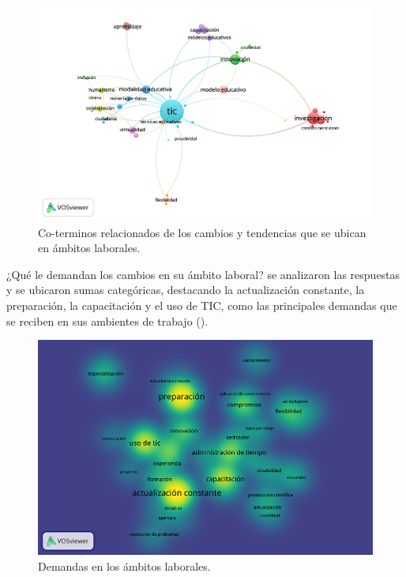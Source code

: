 \documentclass[spanish]{textolivre}
\begin{document}
\begin{figure}[htbp]
 \centering
 \includegraphics[width=\textwidth]{Fig6.png}
 \caption{Co-terminos relacionados de los cambios y tendencias
que se ubican en ámbitos laborales.}
 \label{fig6}
\end{figure}

¿Qué le demandan los cambios en su ámbito laboral? se analizaron las respuestas y se ubicaron sumas categóricas, destacando la actualización constante, la preparación, la capacitación y el uso de TIC, como las principales demandas que se reciben en sus ambientes de trabajo ().

\begin{figure}[htbp]
 \centering
 \includegraphics[width=\textwidth]{Fig7.png}
 \caption{Demandas en los ámbitos laborales.}
 \label{fig7}
\end{figure}
\end{document}
